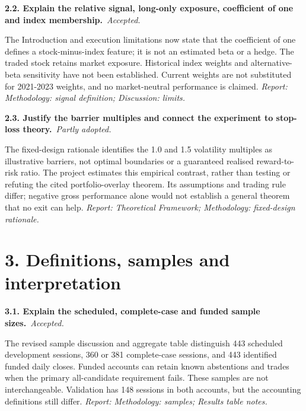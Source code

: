 \documentclass[11pt,a4paper]{article}
\newcommand{\Needspace}[1]{\par\begingroup\ifdim\dimexpr\pagegoal-\pagetotal\relax<#1\relax\newpage\fi\endgroup}
\newcommand{\reply}[3]{\par\addvspace{5pt}\noindent\textbf{#1. #2}\ \textit{#3.}\par\nobreak}
\begin{document}
\par\noindent\begin{minipage}{\linewidth}\justifying
\reply{2.2}{Explain the relative signal, long-only exposure, coefficient of one and index membership.}{Accepted}
The Introduction and execution limitations now state that the coefficient of one defines a stock-minus-index feature; it is not an estimated beta or a hedge. The traded stock retains market exposure. Historical index weights and alternative-beta sensitivity have not been established. Current weights are not substituted for 2021-2023 weights, and no market-neutral performance is claimed.
{\small\textit{Report: Methodology: signal definition; Discussion: limits.}}
\end{minipage}\par\addvspace{5pt}

\par\noindent\begin{minipage}{\linewidth}\justifying
\reply{2.3}{Justify the barrier multiples and connect the experiment to stop-loss theory.}{Partly adopted}
The fixed-design rationale identifies the 1.0 and 1.5 volatility multiples as illustrative barriers, not optimal boundaries or a guaranteed realised reward-to-risk ratio. The project estimates this empirical contrast, rather than testing or refuting the cited portfolio-overlay theorem. Its assumptions and trading rule differ; negative gross performance alone would not establish a general theorem that no exit can help.
{\small\textit{Report: Theoretical Framework; Methodology: fixed-design rationale.}}
\end{minipage}\par\addvspace{5pt}

\Needspace{10\baselineskip}
\section*{3. Definitions, samples and interpretation}
\par\noindent\begin{minipage}{\linewidth}\justifying
\reply{3.1}{Explain the scheduled, complete-case and funded sample sizes.}{Accepted}
The revised sample discussion and aggregate table distinguish 443 scheduled development sessions, 360 or 381 complete-case sessions, and 443 identified funded daily closes. Funded accounts can retain known abstentions and trades when the primary all-candidate requirement fails. These samples are not interchangeable. Validation has 148 sessions in both accounts, but the accounting definitions still differ.
{\small\textit{Report: Methodology: samples; Results table notes.}}
\end{minipage}\par\addvspace{5pt}
\end{document}
